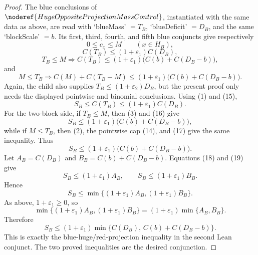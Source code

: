 \begin{proof}
The blue conclusions of
\(\noderef{HugeOppositeProjectionMassControl}\), instantiated with the same
data as above, are read with `blueMass' \(=T_B\), `blueDeficit' \(=D_B\), and
the same `blockScale' \(=b\).  Its first, third, fourth, and fifth blue
conjuncts give respectively
\[
0\le c_x\le M\qquad(x\in H_B), \tag{14}
\]
\[
C(T_B)\le(1+\varepsilon_1)C(D_B), \tag{15}
\]
\[
T_B\le M\Longrightarrow
C(T_B)\le
(1+\varepsilon_1)\bigl(C(b)+C(D_B-b)\bigr), \tag{16}
\]
and
\[
M\le T_B\Longrightarrow
C(M)+C(T_B-M)\le
(1+\varepsilon_1)\bigl(C(b)+C(D_B-b)\bigr). \tag{17}
\]
Again, the child also supplies \(T_B\le(1+\varepsilon_2)D_B\), but the
present proof only needs the displayed pointwise and binomial conclusions.
Using (1) and (15),
\[
S_B\le C(T_B)\le(1+\varepsilon_1)C(D_B). \tag{18}
\]
For the two-block side, if \(T_B\le M\), then (3) and (16) give
\[
S_B\le(1+\varepsilon_1)\bigl(C(b)+C(D_B-b)\bigr),
\]
while if \(M\le T_B\), then (2), the pointwise cap (14), and (17) give the
same inequality.  Thus
\[
S_B\le(1+\varepsilon_1)\bigl(C(b)+C(D_B-b)\bigr). \tag{19}
\]
Let \(A_B=C(D_B)\) and \(B_B=C(b)+C(D_B-b)\).  Equations (18) and (19) give
\[
S_B\le(1+\varepsilon_1)A_B,\qquad
S_B\le(1+\varepsilon_1)B_B.
\]
Hence
\[
S_B\le\min\{(1+\varepsilon_1)A_B,(1+\varepsilon_1)B_B\}.
\]
As above, \(1+\varepsilon_1\ge0\), so
\[
\min\{(1+\varepsilon_1)A_B,(1+\varepsilon_1)B_B\}
=(1+\varepsilon_1)\min\{A_B,B_B\}.
\]
Therefore
\[
S_B\le
(1+\varepsilon_1)\min\{C(D_B),\,C(b)+C(D_B-b)\}.
\]
This is exactly the blue-huge/red-projection inequality in the second Lean
conjunct.  The two proved inequalities are the desired conjunction.
\end{proof}
